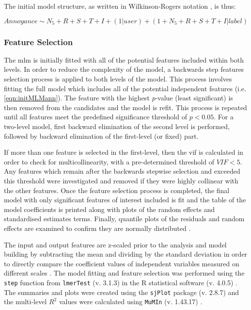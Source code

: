 The initial model structure, as written in Wilkinson-Rogers notation \citep{Wilkinson1973Symbolic}, is thus:

\begin{equation}
  \label{eqn:initMLMann}
      Annoyance \sim N_5 + R + S + T + I + (1 | user) + (1 + N_5 + R + S + T + I | label)
  \end{equation}

\subsubsection{Feature Selection}

The \gls{mlm} is initially fitted with all of the potential features included within both levels. In order to reduce the complexity of the model, a backwards step features selection process is applied to both levels of the model. This process involves fitting the full model which includes all of the potential independent features (i.e. \cref{eqn:initMLMann}). The feature with the highest \emph{p}-value (least significant) is then removed from the candidates and the model is refit. This process is repeated until all features meet the predefined significance threshold of $p < 0.05 $. For a two-level model, first backward elimination of the second level is performed, followed by backward elimination of the first-level (or fixed) part.

If more than one feature is selected in the first-level, then the \gls{vif} is calculated in order to check for multicollinearity, with a pre-determined threshold of ${VIF}<5$. Any features which remain after the backwards stepwise selection and exceeded this threshold were investigated and removed if they were highly collinear with the other features. Once the feature selection process is completed, the final model with only significant features of interest included is fit and the table of the model coefficients is printed along with plots of the random effects and standardised estimates terms. Finally, quantile plots of the residuals and random effects are examined to confirm they are normally distributed \citep{Harrison2018brief}.

The input and output features are z-scaled prior to the analysis and model building by subtracting the mean and dividing by the standard deviation in order to directly compare the coefficient values of independent variables measured on different scales \citep{Harrison2018brief}. The model fitting and feature selection was performed using the \texttt{step} function from \texttt{lmerTest} (v. 3.1.3) \citep{Kuznetsova2017lmerTest} in the R statistical software (v. 4.0.5) \citep{RCT2018R}. The summaries and plots were created using the \texttt{sjPlot} package (v. 2.8.7) \citep{Luedecke2021sjPlot} and the multi-level $R^2$ values were calculated using \texttt{MuMIn} (v. 1.43.17) \citep{Barton2020MuMIN}.

